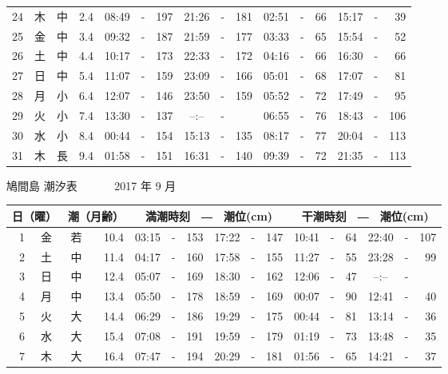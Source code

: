 \documentclass[12pt.a4j]{jsarticle}
\begin{document}
\begin{center}
\begin{table}[ht]
\begin{tabular}{|rc|cr|ccrccr|ccrccr|}
24 & 木 & 中 &  2.4 &  08:49 &-& 197  &  21:26 &-& 181  &   02:51 &-&  66  &   15:17 &-&  39  \\
25 & 金 & 中 &  3.4 &  09:32 &-& 187  &  21:59 &-& 177  &   03:33 &-&  65  &   15:54 &-&  52  \\
26 & 土 & 中 &  4.4 &  10:17 &-& 173  &  22:33 &-& 172  &   04:16 &-&  66  &   16:30 &-&  66  \\
27 & 日 & 中 &  5.4 &  11:07 &-& 159  &  23:09 &-& 166  &   05:01 &-&  68  &   17:07 &-&  81  \\
28 & 月 & 小 &  6.4 &  12:07 &-& 146  &  23:50 &-& 159  &   05:52 &-&  72  &   17:49 &-&  95  \\
29 & 火 & 小 &  7.4 &  13:30 &-& 137  &  --:-- &-&     &   06:55 &-&  76  &   18:43 &-& 106  \\
30 & 水 & 小 &  8.4 &  00:44 &-& 154  &  15:13 &-& 135  &   08:17 &-&  77  &   20:04 &-& 113  \\
31 & 木 & 長 &  9.4 &  01:58 &-& 151  &  16:31 &-& 140  &   09:39 &-&  72  &   21:35 &-& 113  \\
   \hline
   \end{tabular}
\end{table}
\newpage
 {\LARGE 鳩間島  潮汐表　　　}
 {\large 2017 年  9 月}\\
 \begin{table}[ht]
    \begin{tabular}{|rc|cr|ccrccr|ccrccr|}
    \hline
    \multicolumn{2}{|c|}{日（曜）} & \multicolumn{2}{c|}{潮（月齢）} & \multicolumn{6}{c|}{満潮時刻　―　潮位(cm)} & \multicolumn{6}{c|}{干潮時刻　―　潮位(cm)} \\
 \hline
 1 & 金 & 若 & 10.4 &  03:15 &-& 153  &  17:22 &-& 147  &   10:41 &-&  64  &   22:40 &-& 107  \\
 2 & 土 & 中 & 11.4 &  04:17 &-& 160  &  17:58 &-& 155  &   11:27 &-&  55  &   23:28 &-&  99  \\
 3 & 日 & 中 & 12.4 &  05:07 &-& 169  &  18:30 &-& 162  &   12:06 &-&  47  &   --:-- &-&     \\
 4 & 月 & 中 & 13.4 &  05:50 &-& 178  &  18:59 &-& 169  &   00:07 &-&  90  &   12:41 &-&  40  \\
 5 & 火 & 大 & 14.4 &  06:29 &-& 186  &  19:29 &-& 175  &   00:44 &-&  81  &   13:14 &-&  36  \\
 6 & 水 & 大 & 15.4 &  07:08 &-& 191  &  19:59 &-& 179  &   01:19 &-&  73  &   13:48 &-&  35  \\
 7 & 木 & 大 & 16.4 &  07:47 &-& 194  &  20:29 &-& 181  &   01:56 &-&  65  &   14:21 &-&  37  \\

\end{tabular}
\end{table}
\end{center}
\end{document}
